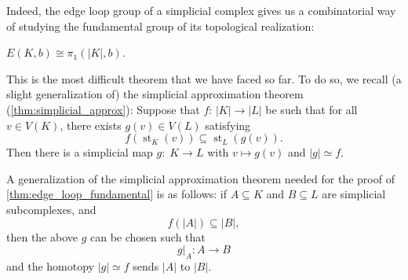 Indeed, the edge loop group of a simplicial complex gives us a combinatorial way of studying the fundamental group of its topological realization: 
\begin{theorem} \label{thm:edge_loop_fundamental}
\(E\left( {K,b}\right)  \cong  {\pi }_{1}\left( {\left| K\right|,b}\right)\).
\end{theorem} 

This is the most difficult theorem that we have faced so far. To do so, we recall (a slight generalization of) the simplicial approximation theorem (\autoref{thm:simplicial_approx}): Suppose that \(f\): \(\left| K\right|  \rightarrow  \left| L\right|\) be such that for all \(v \in  V\left( K\right)\), there exists \(g\left( v\right)  \in  V\left( L\right)\) satisfying
\[
f\left( {{\operatorname{st}}_{K}\left( v\right) }\right)  \subseteq  {\operatorname{st}}_{L}\left( {g\left( v\right) }\right).
\]
Then there is a simplicial map
\(g: \;K \rightarrow  L
\)
with $v \mapsto  g\left( v\right)$
and \(\left| g\right|  \simeq  f\).

A generalization of the simplicial approximation theorem needed for the proof of \autoref{thm:edge_loop_fundamental} is as follows: if \(A \subseteq  K\)
and \(B \subseteq  L\) are simplicial subcomplexes, and \[f\left( \left| A\right| \right)  \subseteq  \left| B\right|,\] 
then the above \(g\) can be chosen such that 
\[{\left. g\right| }_{A}: A \rightarrow  B\] 
and the homotopy \(\left| g\right|  \simeq  f\) sends \(\left| A\right|\) to \(\left| B\right|\).

